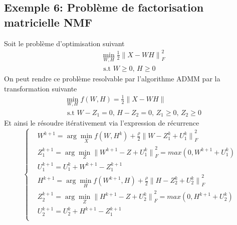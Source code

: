 \documentclass[12pt,a4paper]{report}
\begin{document}
        	\subsection*{Exemple 6: Problème de factorisation matricielle NMF}
            	Soit le problème d'optimisation suivant
            	\begin{equation*}
                	\begin{aligned}
                    	& \min_{W,H} \frac{1}{2} {\| X - WH \|}_F^2   \\
                    	& \text{ s.t  $W \geq 0$, $H \geq 0$ }
                	\end{aligned}
            	\end{equation*}
            	On peut rendre ce problème resolvable par l'algorithme ADMM par la transformation suivante
            	\begin{equation*}
                	\begin{aligned}
                    	& \min_{W,H} f(W,H) = \frac{1}{2}\| X - WH \| \\
                    	& \text{ s.t  $W - Z_1 = 0$, $H - Z_2 = 0$, $Z_1 \geq 0$, $Z_2 \geq 0$}
                	\end{aligned}
            	\end{equation*}
            	Et ainsi le résoudre itérativement via l'expression de récurrence
            	\begin{equation*}
                	\left\{  
                    	\begin{aligned}
                        	& W^{k+1} = \arg\min_{X} f(W,H^k) + \frac{\rho}{2}{\| W - Z_1^k + U_1^k\|}^2_F \\
                        	& Z_1^{k+1} = \arg\min_{Z} {\| W^{k+1} - Z + U_1^k\|}^2_F = max(0, W^{k+1} + U_1^k)\\
                        	& U_1^{k+1} = U_1^{k} + W^{k+1} - Z_1^{k+1} \\
                        	& H^{k+1} = \arg\min_{H} f(W^{k+1},H) + \frac{\rho}{2}{\| H - Z_2^k  + U_2^k\|}^2_F \\
                        	& Z_2^{k+1} = \arg\min_{Z} {\| H^{k+1} - Z + U_2^k\|}^2_F = max(0, H^{k+1} + U_2^k)\\
                        	& U_2^{k+1} = U_2^{k} + H^{k+1} - Z_1^{k+1} \\
                    	\end{aligned}
                	\right.
            	\end{equation*}
           	 
\end{document}
